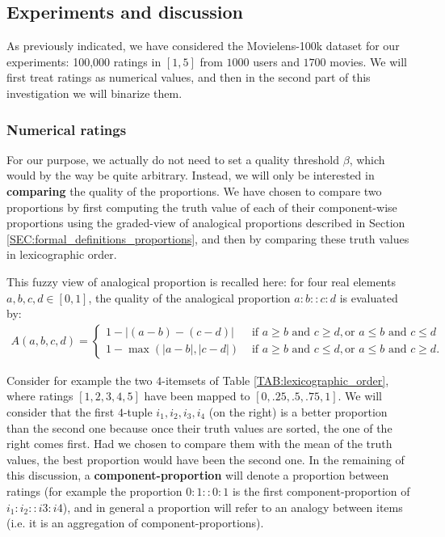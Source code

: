 \subsection{Experiments and discussion}

As previously indicated, we have considered the Movielens-100k dataset for our experiments: 100,000
ratings in $[1, 5]$ from $1000$ users and $1700$ movies. We will first treat
ratings as numerical values, and then in the second part of this investigation
we will binarize them.

\subsubsection{Numerical ratings}

For our purpose, we actually do not need to set a quality threshold $\beta$,
which would by the way be quite arbitrary. Instead, we will only be interested
in \textbf{comparing} the quality of the  proportions. We have chosen to
compare two proportions by first computing the truth value of each of their
component-wise proportions using the graded-view of analogical proportions
described in Section \ref{SEC:formal_definitions_proportions}, and then by
comparing these truth values in lexicographic order.

This fuzzy view of analogical proportion is recalled here: for four real
elements $a, b, c, d \in [0, 1]$, the quality of the analogical proportion
$a:b::c:d$ is evaluated by:
\begin{align*}
A(a, b, c, d) =
\begin{cases}
  1 - |(a - b) - (c - d)| &\text{ if } a \geq b \text { and } c \geq d, \text{
    or } a \leq b \text{ and } c \leq d\\
  1 - \max(|a - b|, |c - d|) &\text{ if } a \geq b \text { and } c \leq d, \text{
    or } a \leq b \text{ and } c \geq d.
\end{cases}
\end{align*}

\begin{testexample}
Consider for example the two $4$-itemsets of Table
\ref{TAB:lexicographic_order}, where ratings $[1, 2, 3, 4, 5]$ have been mapped
to $[0, .25, .5, .75, 1]$. We will consider that the first $4$-tuple $i_1, i_2,
i_3, i_4$ (on the right) is a better proportion than the second one because
once their truth values are sorted, the one of the right comes first. Had we
chosen to compare them with the mean of the truth values, the best proportion
would have been the second one. In the remaining of this discussion, a
\textbf{component-proportion} will denote a proportion between ratings (for
example the proportion $0:1::0:1$ is the first component-proportion of
$i_1:i_2::i3:i4$), and in general a proportion  will refer to an analogy
between items (i.e. it is an aggregation of component-proportions).
\end{testexample}

